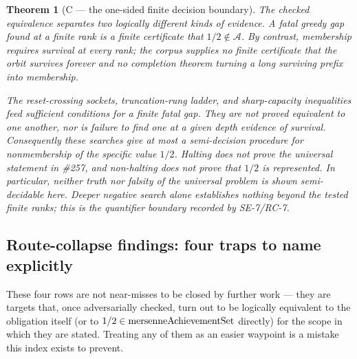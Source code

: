 \documentclass[11pt]{article}
\theoremstyle{plain}
\newtheorem{thm}{Theorem}[section]
\theoremstyle{definition}
\theoremstyle{remark}
\newcommand{\lean}[2]{\leanlink{#2}}
\let\origmathrm\mathrm
\renewcommand{\mathrm}[1]{\ifmmode\origmathrm{#1}\else\textrm{#1}\fi}%
\begin{document}
\begin{thm}[C — the one-sided finite decision boundary]
The checked equivalence
\lean{mem\_mersenneAchievementSet\_iff\_greedy\_survival}{GreedyAchievementSet.lean:1458}
separates two logically different kinds of evidence. A fatal greedy gap found at a finite rank is
a finite certificate that $1/2\notin\mathcal A$. By contrast, membership requires survival at
every rank; the corpus supplies no finite certificate that the orbit survives forever and no
completion theorem turning a long surviving prefix into membership.

The reset-crossing sockets, truncation-rung ladder, and sharp-capacity inequalities feed
sufficient conditions for a finite fatal gap. They are not proved equivalent to one another,
nor is failure to find one at a given depth evidence of survival. Consequently these searches
give at most a semi-decision procedure for \emph{nonmembership of the specific value $1/2$}.
Halting does not prove the universal statement in \#257, and non-halting does not prove that
$1/2$ is represented. In particular, neither truth nor falsity of the universal problem is
shown semi-decidable here. Deeper negative search alone establishes nothing beyond the tested
finite ranks; this is the quantifier boundary recorded by SE-7/RC-7.
\end{thm}

\subsection{Route-collapse findings: four traps to name explicitly}

These four rows are not near-misses to be closed by further work — they are targets that, once
adversarially checked, turn out to be logically equivalent to the obligation itself (or to
$1/2\in\mathrm{mersenneAchievementSet}$ directly) for the scope in which they are stated. Treating
any of them as an easier waypoint is a mistake this index exists to prevent.
\end{document}
